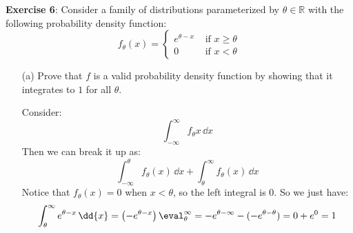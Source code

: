 \documentclass{article}
\begin{document}
    \textbf{Exercise 6}: Consider a family of distributions parameterized by $\theta \in \mathbb{R}$ with the following probability density function:
        \begin{equation*}
            f_{\theta}(x) = \begin{cases}
                e^{\theta - x} &\text{ if } x \geq \theta \\
                0 &\text{ if } x < \theta       
            \end{cases}
        \end{equation*}
        \begin{itemize}
            \item [(a)] Prove that $f$ is a valid probability density function by showing that it integrates to $1$ for all $\theta$.
                \begin{answer}
                    Consider:
                        \begin{equation*}
                            \int_{-\infty}^{\infty} f_{\theta}x \, \dd{x}
                        \end{equation*}
                    Then we can break it up as:
                        \begin{equation*}
                            \int_{-\infty}^{\theta} f_{\theta}(x) \, \dd{x} + \int_{\theta}^{\infty} f_{\theta}(x) \, \dd{x}
                        \end{equation*}
                    Notice that $f_{\theta}(x) = 0$ when $x < \theta$, so the left integral is $0$. So we just have:
                        \begin{equation*}
                            \int_{\theta}^{\infty} e^{\theta - x} \, \dd{x} = \left(-e^{\theta - x}\right) \eval_{\theta}^{\infty} = -e^{\theta - \infty} - (-e^{\theta - \theta}) = 0 + e^{0} = 1
                        \end{equation*}
                \end{answer}


\end{itemize}
\end{document}
